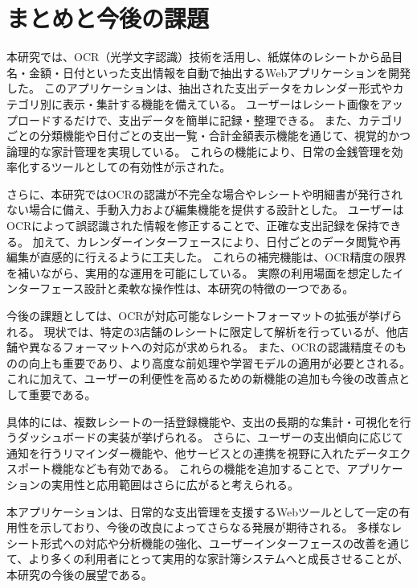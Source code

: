 \documentclass[main]{subfiles}
\begin{document}
\chapter{まとめと今後の課題}
\label{cha:conclusion}
本研究では、OCR（光学文字認識）技術を活用し、紙媒体のレシートから品目名・金額・日付といった支出情報を自動で抽出するWebアプリケーションを開発した。  
このアプリケーションは、抽出された支出データをカレンダー形式やカテゴリ別に表示・集計する機能を備えている。  
ユーザーはレシート画像をアップロードするだけで、支出データを簡単に記録・整理できる。  
また、カテゴリごとの分類機能や日付ごとの支出一覧・合計金額表示機能を通じて、視覚的かつ論理的な家計管理を実現している。  
これらの機能により、日常の金銭管理を効率化するツールとしての有効性が示された。

さらに、本研究ではOCRの認識が不完全な場合やレシートや明細書が発行されない場合に備え、手動入力および編集機能を提供する設計とした。  
ユーザーはOCRによって誤認識された情報を修正することで、正確な支出記録を保持できる。  
加えて、カレンダーインターフェースにより、日付ごとのデータ閲覧や再編集が直感的に行えるように工夫した。  
これらの補完機能は、OCR精度の限界を補いながら、実用的な運用を可能にしている。  
実際の利用場面を想定したインターフェース設計と柔軟な操作性は、本研究の特徴の一つである。

今後の課題としては、OCRが対応可能なレシートフォーマットの拡張が挙げられる。  
現状では、特定の3店舗のレシートに限定して解析を行っているが、他店舗や異なるフォーマットへの対応が求められる。  
また、OCRの認識精度そのものの向上も重要であり、より高度な前処理や学習モデルの適用が必要とされる。  
これに加えて、ユーザーの利便性を高めるための新機能の追加も今後の改善点として重要である。

具体的には、複数レシートの一括登録機能や、支出の長期的な集計・可視化を行うダッシュボードの実装が挙げられる。  
さらに、ユーザーの支出傾向に応じて通知を行うリマインダー機能や、他サービスとの連携を視野に入れたデータエクスポート機能なども有効である。  
これらの機能を追加することで、アプリケーションの実用性と応用範囲はさらに広がると考えられる。

本アプリケーションは、日常的な支出管理を支援するWebツールとして一定の有用性を示しており、今後の改良によってさらなる発展が期待される。  
多様なレシート形式への対応や分析機能の強化、ユーザーインターフェースの改善を通じて、より多くの利用者にとって実用的な家計簿システムへと成長させることが、本研究の今後の展望である。
\end{document}
